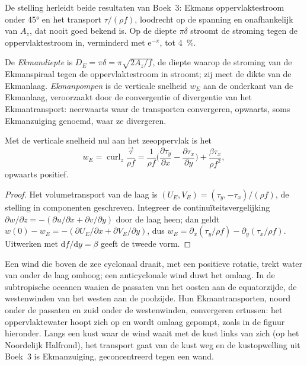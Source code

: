 De stelling herleidt beide resultaten van Boek~3: Ekmans oppervlaktestroom
onder \ang{45} en het transport $\tau/(\rho f)$, loodrecht op de spanning en
onafhankelijk van $A_z$, dat nooit goed bekend is. Op de
diepte $\pi\delta$ stroomt de stroming tegen de oppervlaktestroom in, verminderd
met $\mathrm e^{-\pi}$, tot \qty{4}{\percent}.

\begin{definition}\label{def:b3:ocean-dynamics:ekman-pumping}
De \emph{Ekmandiepte} is $D_E = \pi\delta =
\pi\sqrt{2A_z/f}$, de diepte waarop de stroming van de Ekmanspiraal
tegen de oppervlaktestroom in stroomt; zij meet de dikte van de
Ekmanlaag. \emph{Ekmanpompen} is de verticale
snelheid $w_E$ aan de onderkant van de Ekmanlaag, veroorzaakt door de convergentie of
divergentie van het Ekmantransport: neerwaarts waar de transporten
convergeren, opwaarts, soms Ekmanzuiging genoemd, waar ze divergeren.
\end{definition}

\begin{proposition}[Ekmanpompen]\label{prop:b3:ocean-dynamics:pumping}
Met de verticale snelheid nul aan het zeeoppervlak is het 
\[
w_E = \operatorname{curl}_z\frac{\vec\tau}{\rho f}
= \frac{1}{\rho f}\Big(\frac{\partial\tau_y}{\partial x} -
\frac{\partial\tau_x}{\partial y}\Big) + \frac{\beta\tau_x}{\rho f^2} ,
\]
opwaarts positief.
\end{proposition}

\begin{proof}
Het volumetransport van de laag is $(U_E, V_E) = (\tau_y,
-\tau_x)/(\rho f)$, de stelling in componenten geschreven. Integreer de
continuïteitsvergelijking $\partial w/\partial z = -(\partial u/\partial x +
\partial v/\partial y)$ door de laag heen; dan geldt $w(0) - w_E = -(\partial
U_E/\partial x + \partial V_E/\partial y)$, dus $w_E = \partial_x(\tau_y/\rho
f) - \partial_y(\tau_x/\rho f)$. Uitwerken met $\mathrm df/\mathrm dy =
\beta$ geeft de tweede vorm.
\end{proof}

Een wind die boven de zee cyclonaal draait, met een positieve rotatie, trekt
water van onder de laag omhoog; een anticyclonale wind duwt het omlaag. In de subtropische oceanen
waaien de passaten van het oosten aan de
equatorzijde, de westenwinden van het westen aan de poolzijde. Hun Ekmantransporten,
noord onder de passaten en zuid onder de westenwinden,
convergeren ertussen: het oppervlaktewater hoopt zich op en wordt omlaag gepompt, zoals
in de figuur hieronder. Langs een kust waar de
wind waait met de kust links van zich (op het Noordelijk Halfrond), het
transport gaat van de kust weg en de kustopwelling uit Boek~3 is
Ekmanzuiging, geconcentreerd tegen een wand.

